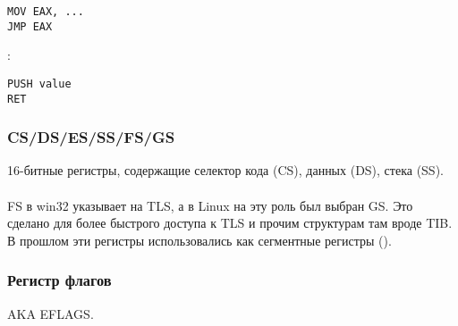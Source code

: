 \begin{lstlisting}
MOV EAX, ...
JMP EAX
\end{lstlisting}

:

\begin{lstlisting}
PUSH value
RET
\end{lstlisting}

\subsubsection{CS/DS/ES/SS/FS/GS}

16-битные регистры, содержащие селектор кода (CS), 
данных (DS), стека (SS).\\
\\
FS в win32 указывает на \ac{TLS}, а в Linux на эту роль был выбран GS.
Это сделано для более быстрого доступа к \ac{TLS} и прочим структурам там вроде \ac{TIB}.
\\
В прошлом эти регистры использовались как сегментные регистры
().

\subsubsection{Регистр флагов}
\label{EFLAGS}
\ac{AKA} EFLAGS.

